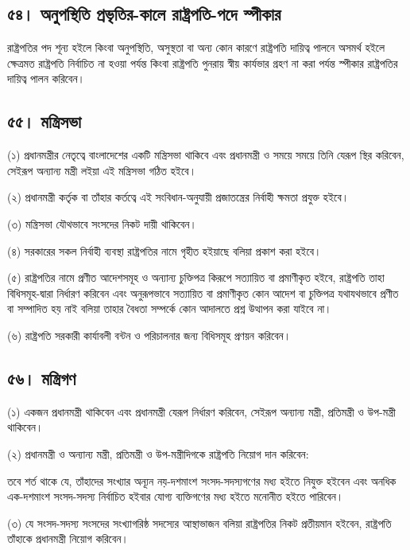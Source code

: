 \documentclass[11pt]{article}
\begin{document}
\subsection{৫৪। অনুপস্থিতি প্রভৃতির-কালে রাষ্ট্রপতি-পদে স্পীকার}
\label{sec:org0da3fa4}
রাষ্ট্রপতির পদ শূন্য হইলে কিংবা অনুপস্থিতি, অসুস্থতা বা অন্য কোন কারণে রাষ্ট্রপতি
দায়িত্ব পালনে অসমর্থ হইলে ক্ষেত্রমত রাষ্ট্রপতি নির্বাচিত না হওয়া পর্যন্ত কিংবা
রাষ্ট্রপতি পুনরায় স্বীয় কার্যভার গ্রহণ না করা পর্যন্ত স্পীকার রাষ্ট্রপতির দায়িত্ব
পালন করিবেন।

\subsection{৫৫। মন্ত্রিসভা}
\label{sec:orgb5ba1d5}
(১) প্রধানমন্ত্রীর নেতৃত্বে বাংলাদেশের একটি মন্ত্রিসভা থাকিবে এবং প্রধানমন্ত্রী
    ও সময়ে সময়ে তিনি যেরূপ স্থির করিবেন, সেইরূপ অন্যান্য মন্ত্রী লইয়া এই মন্ত্রিসভা
    গঠিত হইবে।

(২) প্রধানমন্ত্রী কর্তৃক বা তাঁহার কর্তত্বে এই সংবিধান-অনুযায়ী প্রজাতন্ত্রের
    নির্বাহী ক্ষমতা প্রযুক্ত হইবে।

(৩) মন্ত্রিসভা যৌথভাবে সংসদের নিকট দায়ী থাকিবেন।

(৪) সরকারের সকল নির্বাহী ব্যবস্থা রাষ্ট্রপতির নামে গৃহীত হইয়াছে বলিয়া প্রকাশ
    করা হইবে।

(৫) রাষ্ট্রপতির নামে প্রণীত আদেশসমূহ ও অন্যান্য চুক্তিপত্র কিরূপে সত্যায়িত বা
    প্রমাণীকৃত হইবে, রাষ্ট্রপতি তাহা বিধিসমূহ-দ্বারা নির্ধারণ করিবেন এবং অনুরূপভাবে
    সত্যায়িত বা প্রমাণীকৃত কোন আদেশ বা চুক্তিপত্র যথাযথভাবে প্রণীত বা সম্পাদিত হয়
    নাই বলিয়া তাহার বৈধতা সম্পর্কে কোন আদালতে প্রশ্ন উত্থাপন করা যাইবে না।

(৬) রাষ্ট্রপতি সরকারী কার্যাবলী বন্টন ও পরিচালনার জন্য বিধিসমূহ প্রণয়ন
    করিবেন।

\subsection{৫৬। মন্ত্রিগণ}
\label{sec:org737c489}
(১) একজন প্রধানমন্ত্রী থাকিবেন এবং প্রধানমন্ত্রী যেরূপ নির্ধারণ করিবেন, সেইরূপ
    অন্যান্য মন্ত্রী, প্রতিমন্ত্রী ও উপ-মন্ত্রী থাকিবেন।

(২) প্রধানমন্ত্রী ও অন্যান্য মন্ত্রী, প্রতিমন্ত্রী ও উপ-মন্ত্রীদিগকে রাষ্ট্রপতি
    নিয়োগ দান করিবেন:

তবে শর্ত থাকে যে, তাঁহাদের সংখ্যার অন্যূন নয়-দশমাংশ সংসদ-সদস্যগণের মধ্য হইতে
নিযুক্ত হইবেন এবং অনধিক এক-দশমাংশ সংসদ-সদস্য নির্বাচিত হইবার যোগ্য
ব্যক্তিগণের মধ্য হইতে মনোনীত হইতে পারিবেন।

(৩) যে সংসদ-সদস্য সংসদের সংখ্যাগরিষ্ঠ সদস্যের আস্থাভাজন বলিয়া রাষ্ট্রপতির
    নিকট প্রতীয়মান হইবেন, রাষ্ট্রপতি তাঁহাকে প্রধানমন্ত্রী নিয়োগ করিবেন।
\end{document}
